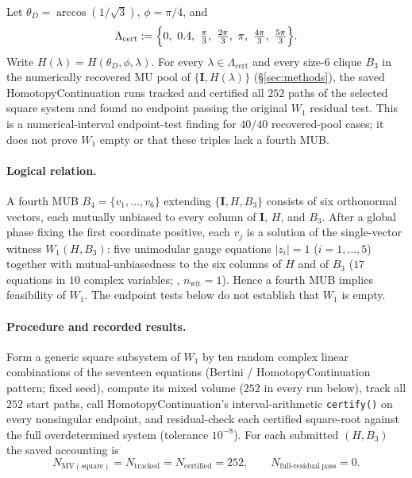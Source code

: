 \begin{finding}
\label{thm:T3}
\label{claim:T3}
Let $\theta_D=\arccos(1/\sqrt{3})$, $\phi=\pi/4$, and
\[
\Lambda_{\mathrm{cert}}:=\Bigl\{0,\ 0.4,\ \tfrac{\pi}{3},\ \tfrac{2\pi}{3},\ \pi,\ \tfrac{4\pi}{3},\ \tfrac{5\pi}{3}\Bigr\}.
\]
Write $H(\lambda)=H(\theta_D,\phi,\lambda)$.
For every $\lambda\in\Lambda_{\mathrm{cert}}$ and every size-$6$ clique $B_3$ in the numerically recovered MU pool of $\{\mathbf{I},H(\lambda)\}$ (\S\ref{sec:methods}), the saved HomotopyContinuation runs tracked and certified all $252$ paths of the selected square system and found no endpoint passing the original $W_1$ residual test. This is a numerical-interval endpoint-test finding for $40/40$ recovered-pool cases; it does not prove $W_1$ empty or that these triples lack a fourth MUB.
\end{finding}

\paragraph{Logical relation.}
A fourth MUB $B_4=\{v_1,\ldots,v_6\}$ extending $\{\mathbf{I},H,B_3\}$ consists of six orthonormal vectors, each mutually unbiased to every column of $\mathbf{I}$, $H$, and $B_3$.
After a global phase fixing the first coordinate positive, each $v_j$ is a solution of the single-vector witness $W_1(H,B_3)$:
five unimodular gauge equations $|z_i|=1$ ($i=1,\ldots,5$) together with mutual-unbiasedness to the six columns of $H$ and of $B_3$ ($17$ equations in $10$ complex variables; , $n_{\mathrm{wit}}=1$).
Hence a fourth MUB implies feasibility of $W_1$. The endpoint tests below do not establish that $W_1$ is empty.

\paragraph{Procedure and recorded results.}
Form a generic square subsystem of $W_1$ by ten random complex linear combinations of the seventeen equations (Bertini / HomotopyContinuation pattern; fixed seed), compute its mixed volume ($252$ in every run below), track all $252$ start paths, call HomotopyContinuation's interval-arithmetic \texttt{certify()} on every nonsingular endpoint, and residual-check each certified square-root against the full overdetermined system (tolerance $10^{-8}$).
For each submitted $(H,B_3)$ the saved accounting is
\[
N_{\mathrm{MV(square)}}=N_{\mathrm{tracked}}=N_{\mathrm{certified}}=252,\qquad
N_{\mathrm{full\text{-}residual\ pass}}=0.
\]

